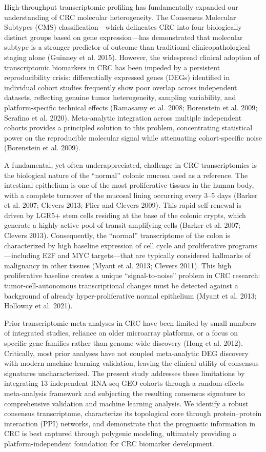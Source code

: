 \documentclass[
  12pt,
]{article}
\begin{document}
High-throughput transcriptomic profiling has fundamentally expanded our
understanding of CRC molecular heterogeneity. The Consensus Molecular
Subtypes (CMS) classification---which delineates CRC into four
biologically distinct groups based on gene expression---has demonstrated
that molecular subtype is a stronger predictor of outcome than
traditional clinicopathological staging alone (Guinney et al. 2015).
However, the widespread clinical adoption of transcriptomic biomarkers
in CRC has been impeded by a persistent reproducibility crisis:
differentially expressed genes (DEGs) identified in individual cohort
studies frequently show poor overlap across independent datasets,
reflecting genuine tumor heterogeneity, sampling variability, and
platform-specific technical effects (Ramasamy et al. 2008; Borenstein et
al. 2009; Serafino et al. 2020). Meta-analytic integration across
multiple independent cohorts provides a principled solution to this
problem, concentrating statistical power on the reproducible molecular
signal while attenuating cohort-specific noise (Borenstein et al. 2009).

A fundamental, yet often underappreciated, challenge in CRC
transcriptomics is the biological nature of the ``normal'' colonic
mucosa used as a reference. The intestinal epithelium is one of the most
proliferative tissues in the human body, with a complete turnover of the
mucosal lining occurring every 3--5 days (Barker et al. 2007; Clevers
2013; Flier and Clevers 2009). This rapid self-renewal is driven by
LGR5+ stem cells residing at the base of the colonic crypts, which
generate a highly active pool of transit-amplifying cells (Barker et al.
2007; Clevers 2013). Consequently, the ``normal'' transcriptome of the
colon is characterized by high baseline expression of cell cycle and
proliferative programs---including E2F and MYC targets---that are
typically considered hallmarks of malignancy in other tissues (Myant et
al. 2013; Clevers 2011). This high proliferative baseline creates a
unique ``signal-to-noise'' problem in CRC research:
tumor-cell-autonomous transcriptional changes must be detected against a
background of already hyper-proliferative normal epithelium (Myant et
al. 2013; Holloway et al. 2021).

Prior transcriptomic meta-analyses in CRC have been limited by small
numbers of integrated studies, reliance on older microarray platforms,
or a focus on specific gene families rather than genome-wide discovery
(Hong et al. 2012). Critically, most prior analyses have not coupled
meta-analytic DEG discovery with modern machine learning validation,
leaving the clinical utility of consensus signatures uncharacterized.
The present study addresses these limitations by integrating 13
independent RNA-seq GEO cohorts through a random-effects meta-analysis
framework and subjecting the resulting consensus signature to
comprehensive validation and machine learning analysis. We identify a
robust consensus transcriptome, characterize its topological core
through protein--protein interaction (PPI) networks, and demonstrate
that the prognostic information in CRC is best captured through
polygenic modeling, ultimately providing a platform-independent
foundation for CRC biomarker development.
\end{document}
